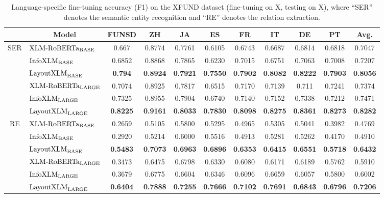 \documentclass[11pt]{article}
\newcommand{\task}{\textsc{XFUND}\xspace}
\begin{document}
\begin{table*}[ht]
	\small
	\centering
	\begin{tabular}{c|lccccccccc}
		\toprule
& \multicolumn{1}{c}{\bf Model}      & \bf FUNSD & \bf ZH & \bf JA & \bf ES & \bf FR & \bf IT & \bf DE & \bf PT & \bf Avg. \\\midrule
		\multirow{6}{*}{SER} & $\textrm{XLM-RoBERTa}_{\rm BASE}$  & 0.667  & 0.8774 & 0.7761 & 0.6105 & 0.6743 & 0.6687 & 0.6814 & 0.6818 & 0.7047      \\
		                    & $\textrm{InfoXLM}_{\rm BASE}$      & 0.6852 & 0.8868 & 0.7865 & 0.6230 & 0.7015 & 0.6751 & 0.7063 & 0.7008 & 0.7207      \\
		                    & $\textrm{LayoutXLM}_{\rm BASE}$    & \bf 0.794  & \bf 0.8924 & \bf 0.7921 & \bf 0.7550 & \bf 0.7902 & \bf 0.8082 & \bf 0.8222 & \bf 0.7903 & \bf 0.8056      \\ \cmidrule{2-11}
		                    & $\textrm{XLM-RoBERTa}_{\rm LARGE}$ & 0.7074 & 0.8925 & 0.7817 & 0.6515 & 0.7170 & 0.7139 & 0.711  & 0.7241 & 0.7374      \\
		                    & $\textrm{InfoXLM}_{\rm LARGE}$     & 0.7325 & 0.8955 & 0.7904 & 0.6740 & 0.7140 & 0.7152 & 0.7338 & 0.7212 & 0.7471      \\
		                    & $\textrm{LayoutXLM}_{\rm LARGE}$   & \bf 0.8225 & \bf 0.9161 & \bf 0.8033 & \bf 0.7830 & \bf 0.8098 & \bf 0.8275 & \bf 0.8361 & \bf 0.8273 & \bf 0.8282      \\\midrule
		\multirow{6}{*}{RE} & $\textrm{XLM-RoBERTa}_{\rm BASE}$  & 0.2659 & 0.5105 & 0.5800 & 0.5295 & 0.4965 & 0.5305 & 0.5041 & 0.3982 & 0.4769 \\
		                    & $\textrm{InfoXLM}_{\rm BASE}$      & 0.2920 & 0.5214 & 0.6000 & 0.5516 & 0.4913 & 0.5281 & 0.5262 & 0.4170 & 0.4910 \\
		                     & $\textrm{LayoutXLM}_{\rm BASE}$    & \bf 0.5483 & \bf 0.7073 & \bf 0.6963 & \bf 0.6896 & \bf 0.6353 & \bf 0.6415 & \bf 0.6551 & \bf 0.5718 & \bf 0.6432 \\ \cmidrule{2-11}
		                    & $\textrm{XLM-RoBERTa}_{\rm LARGE}$ & 0.3473 & 0.6475 & 0.6798 & 0.6330 & 0.6080 & 0.6171 & 0.6189 & 0.5762 & 0.5910 \\
		                    & $\textrm{InfoXLM}_{\rm LARGE}$     & 0.3679 & 0.6775 & 0.6604 & 0.6346 & 0.6096 & 0.6659 & 0.6057 & 0.5800 & 0.6002 \\
		                    & $\textrm{LayoutXLM}_{\rm LARGE}$   & \bf 0.6404 & \bf 0.7888 & \bf 0.7255 & \bf 0.7666 & \bf 0.7102 & \bf 0.7691 & \bf 0.6843 & \bf 0.6796 & \bf 0.7206 \\
		\bottomrule
	\end{tabular}
	\caption{Language-specific fine-tuning accuracy (F1) on the \task dataset (fine-tuning on X, testing on X), where ``SER'' denotes the semantic entity recognition and ``RE'' denotes the relation extraction.}
	\label{tab:x2x}
\end{table*}
\end{document}
